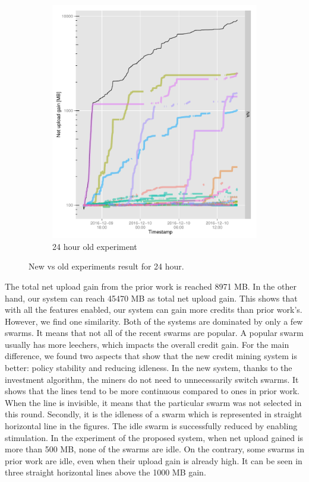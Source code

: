 \begin{figure}[h]
\begin{adjustwidth}{-1.5cm}{}
\begin{subfigure}[t]{0.6\textwidth}
			\includegraphics[width=\textwidth]{pics/results/m138.pdf}
			\caption{24 hour old experiment}
			\label{fig:oldetree24}
		\end{subfigure}
		\caption{New vs old experiments result for 24 hour.}
	\end{adjustwidth}
\end{figure}

The total net upload gain from the prior work is reached 8971 MB. In the other hand, our system can reach 45470 MB as total net upload gain. This shows that with all the features enabled, our system can gain more credits than prior work's. However, we find one similarity. Both of the systems are dominated by only a few swarms. It means that not all of the recent swarms are popular. A popular swarm usually has more leechers, which impacts the overall credit gain. For the main difference, we found two aspects that show that the new credit mining system is better: policy stability and reducing idleness. In the new system, thanks to the investment algorithm, the miners do not need to unnecessarily switch swarms. It shows that the lines tend to be more continuous compared to ones in prior work. When the line is invisible, it means that the particular swarm was not selected in this round. Secondly, it is the idleness of a swarm which is represented in straight horizontal line in the figures. The idle swarm is successfully reduced by enabling stimulation. In the experiment of the proposed system, when net upload gained is more than 500 MB, none of the swarms are idle. On the contrary, some swarms in prior work are idle, even when their upload gain is already high. It can be seen in three straight horizontal lines above the 1000 MB gain.

